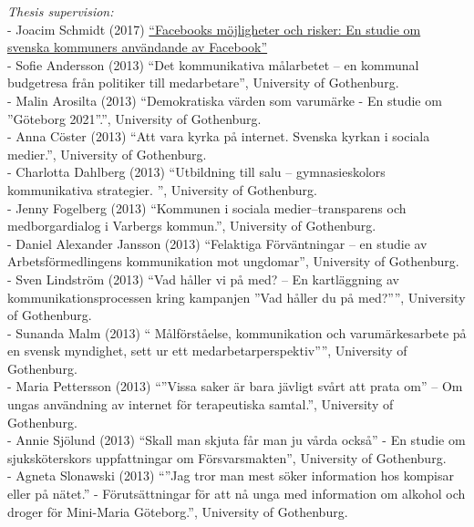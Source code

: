 \documentclass[a4paper,11pt,oneside]{article}
\begin{document}
             \noindent \emph{Thesis supervision:} \\
             - Joacim Schmidt (2017) \href{https://gupea.ub.gu.se/bitstream/2077/52545/1/gupea_2077_52545_1.pdf}{``Facebooks möjligheter och risker: En studie om svenska kommuners användande av Facebook''}\\
             - Sofie Andersson (2013) ``Det kommunikativa målarbetet – en kommunal budgetresa från politiker till medarbetare'', University of Gothenburg.\\
             - Malin Arosilta (2013) ``Demokratiska värden som varumärke - En studie om ''Göteborg 2021''.'', University of Gothenburg.\\
             - Anna Cöster (2013) ``Att vara kyrka på internet. Svenska kyrkan i sociala medier.'', University of Gothenburg.\\
             - Charlotta Dahlberg (2013) ``Utbildning till salu – gymnasieskolors kommunikativa strategier. '', University of Gothenburg.\\
             - Jenny Fogelberg (2013) ``Kommunen i sociala medier–transparens och medborgardialog i Varbergs kommun.'', University of Gothenburg.\\
             - Daniel Alexander Jansson (2013) ``Felaktiga Förväntningar – en studie av Arbetsförmedlingens kommunikation mot ungdomar'', University of Gothenburg.\\
             - Sven Lindström (2013) ``Vad håller vi på med? – En kartläggning av kommunikationsprocessen kring kampanjen ”Vad håller du på med?”'', University of Gothenburg.\\
             - Sunanda Malm (2013) `` Målförståelse, kommunikation och varumärkesarbete på en svensk myndighet, sett ur ett medarbetarperspektiv'''', University of Gothenburg.\\
             - Maria Pettersson (2013) ``''Vissa saker är bara jävligt svårt att prata om'' – Om ungas användning av internet för terapeutiska samtal.'', University of Gothenburg.\\
             - Annie Sjölund (2013) ``Skall man skjuta får man ju vårda också'' - En studie om sjuksköterskors uppfattningar om Försvarsmakten'', University of Gothenburg.\\
             - Agneta Slonawski (2013) ``”Jag tror man mest söker information hos kompisar eller på nätet.” - Förutsättningar för att nå unga med information om alkohol och droger för Mini-Maria Göteborg.'', University of Gothenburg.\\
\end{document}
